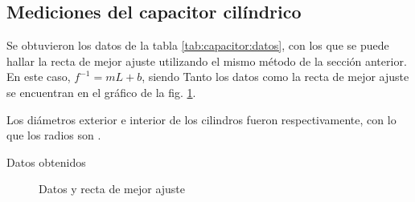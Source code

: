 \subsection{Mediciones del capacitor cilíndrico}

Se obtuvieron los datos de la tabla \ref{tab:capacitor:datos}, con los que se 
puede hallar la recta de mejor ajuste utilizando el mismo método de la sección
anterior. En este caso, $f^{-1} = mL + b$, siendo
 Tanto los datos como la recta de mejor ajuste se encuentran en el gráfico de la
fig. \ref{fig:capacitor:rectas}.

Los diámetros exterior e interior de los cilindros fueron 
 respectivamente,
con lo que los radios son 
.
\vspace{10mm}
\begin{table}[H]
    \centering
    \caption{Datos obtenidos}
    \label{tab:capacitor:datos}
\end{table}

\begin{figure}[H]
    \centering
    
    \caption{Datos y recta de mejor ajuste}
    \label{fig:capacitor:rectas}
\end{figure}
